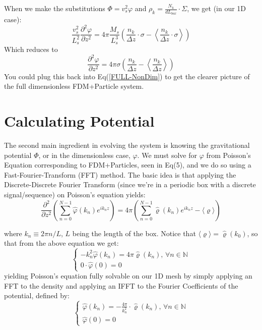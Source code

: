 \documentclass[oneside]{book}
\newcommand{\pd}{\partial}
\begin{document}
When we make the substitutions $\Phi = v_s^2 \varphi$ and $\rho_k = \frac{N_k}{dL_{box}}\cdot \Sigma$, we get (in our 1D case):
\begin{equation*}
    \frac{v_s^2}{L_s^2}\frac{\pd^2 \varphi}{\pd z^2} = 4\pi \frac{M_s}{L_s^3} \left( \frac{n_k}{\Delta z}\cdot \sigma - \left\langle \frac{n_k}{\Delta z}\cdot \sigma \right\rangle\right)
\end{equation*}
Which reduces to
\begin{equation}
    \frac{\pd^2 \varphi}{\pd z^2} = 4\pi \sigma \left( \frac{n_k}{\Delta z} - \left\langle \frac{n_k}{\Delta z}\right\rangle\right)
    \label{Particle NonDim Poisson's Equation}
\end{equation}
You could plug this back into Eq(\ref{FULL-NonDim}) to get the clearer picture of the full dimensionless FDM+Particle system.

\section{Calculating Potential}
The second main ingredient in evolving the system is knowing the gravitational potential $\Phi$, or in the dimensionless case, $\varphi$. We must solve for $\varphi$ from Poisson's Equation corresponding to FDM+Particles, seen in Eq(5), and we do so using a Fast-Fourier-Transform (FFT) method. The basic idea is that applying the Discrete-Discrete Fourier Transform (since we're in a periodic box with a discrete signal/sequence) on Poisson's equation yields:
\begin{equation*}
    \frac{\pd^2}{\pd z^2}\left(\sum_{n=0}^{N-1} \hat{\varphi}(k_n) e^{i k_n z}\right) = 4 \pi \left(\sum_{n=0}^{N-1} \hat{\varrho}(k_n) e^{i k_n z} - \langle\varrho\rangle\right)
\end{equation*}

where $k_n \equiv 2\pi n / L$, $L$ being the length of the box. Notice that $\langle\varrho\rangle = \hat{\varrho}(k_0)$, so that from the above equation we get:
\begin{equation*}
    \begin{cases}
    -k_n^2 \hat{\varphi}(k_n) = 4 \pi \hat{\varrho}(k_n) \text{, $\forall n \in \mathbb{N}$} \\
    0\cdot \hat{\varphi}(0) = 0
    \end{cases}
\end{equation*}
yielding Poisson's equation fully solvable on our 1D mesh by simply applying an FFT to the density and applying an IFFT to the Fourier Coefficients of the potential, defined by:
\begin{equation*}
    \begin{cases}
    \hat{\varphi}(k_n) = - \frac{4 \pi}{k_n^2} \cdot \hat{\varrho}(k_n) \text{, $\forall n \in \mathbb{N}$} \\
    \hat{\varphi}(0) = 0
    \end{cases}
\end{equation*}
\end{document}
